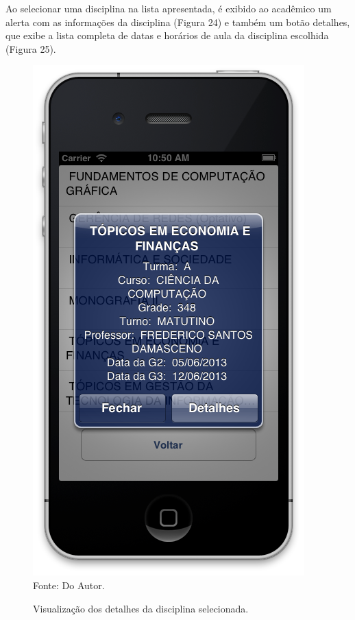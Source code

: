 Ao selecionar uma disciplina na lista apresentada, é exibido ao acadêmico um alerta com as informações da disciplina (Figura 24) e também um botão detalhes, que exibe a lista completa de datas e horários de aula da disciplina escolhida (Figura 25).

\begin{figure}[!htb]
     \centering
     \caption[Formulário Horários do Semestre - Visualização de Informações]{Visualização dos detalhes da disciplina selecionada.}
     \includegraphics[scale=0.34]{imagens/formhorariossemestredetalhes.png}
     \\  Fonte: Do Autor.
\end{figure}
